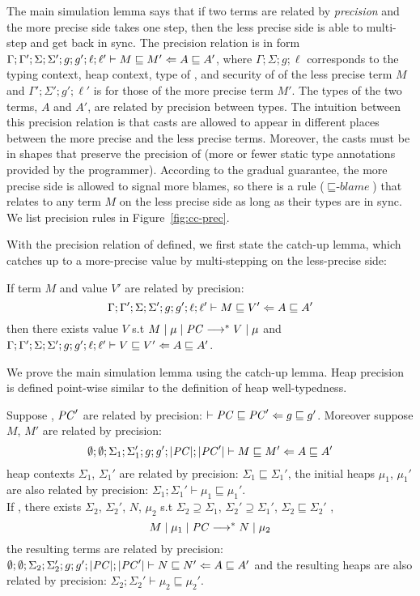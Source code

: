 The main simulation lemma says that if two terms are related by
\textit{precision} and the more precise side takes one step, then the less
precise side is able to multi-step and get back in sync. The precision relation
is in form
${\Gamma};{\Gamma'};{\Sigma};{\Sigma'};{g};{g'};{\ell};{\ell'}\vdash{M}\sqsubseteq{M'}\Leftarrow{A}\sqsubseteq{A'}$,
where $\Gamma;\Sigma;g;\ell$ corresponds to the typing context, heap context,
type of \PC, and security of \PC of the less precise term $M$ and
$\Gamma';\Sigma';g';\ell'$ is for those of the more precise term $M'$. The types
of the two terms, $A$ and $A'$, are related by precision between types. The
intuition between this precision relation is that casts are allowed to appear in
different places between the more precise and the less precise \CC terms.
Moreover, the casts must be in shapes that preserve the precision of \Surface
(more or fewer static type annotations provided by the programmer). According to
the gradual guarantee, the more precise side is allowed to signal more blames,
so there is a rule (${\sqsubseteq}\textit{-blame}$) that relates  to
any term $M$ on the less precise side as long as their types are in sync. We
list precision rules in Figure~\ref{fig:cc-prec}.

With the precision relation of \CC defined, we first state the catch-up lemma,
which catches up to a more-precise value by multi-stepping on the less-precise
side:

\begin{lemma}
\label{lem:catchup}
If term $M$ and value $V'$ are related by precision:
$${\Gamma};{\Gamma'};{\Sigma};{\Sigma'};{g};{g'};{\ell};{\ell'}\vdash{M}\sqsubseteq{V'}\Leftarrow{A}\sqsubseteq{A'}$$
then there exists value $V$ s.t $M\mid\mu\mid\mathit{PC} \longrightarrow^{*} V\mid\mu$ and
${\Gamma};{\Gamma'};{\Sigma};{\Sigma'};{g};{g'};{\ell};{\ell'}\vdash{V}\sqsubseteq{V'}\Leftarrow{A}\sqsubseteq{A'}$.
\end{lemma}

We prove the main simulation lemma using the catch-up lemma. Heap precision is
defined point-wise similar to the definition of heap well-typedness.

\begin{lemma}
\label{lem:sim}
Suppose \PC, $\mathit{PC}'$ are related by precision: $\ccprec{\PC}{\PC'}{g}{g'}$.
Moreover suppose $M$, $M'$ are related by precision:
$${\emptyset};{\emptyset};{\Sigma_1};{\Sigma_1'};{g};{g'};{|\mathit{PC}|};{|\mathit{PC}'|}\vdash{M}\sqsubseteq{M'}\Leftarrow{A}\sqsubseteq{A'}$$
heap contexts $\Sigma_1$, $\Sigma_1'$ are related by precision:
$\Sigma_1 \sqsubseteq \Sigma_1'$, the initial heaps $\mu_1$, $\mu_1'$
are also related by precision: $\Sigma_1 ; \Sigma_1' \vdash \mu_1 \sqsubseteq \mu_1'$. \\
If , there exists $\Sigma_2$,
$\Sigma_2'$, $N$, $\mu_2$ s.t $\Sigma_2 \supseteq \Sigma_1$,
$\Sigma_2' \supseteq \Sigma_1'$, $\Sigma_2 \sqsubseteq \Sigma_2'$ ,
$$M\mid\mu_1\mid\mathit{PC} \longrightarrow^{*} N\mid\mu_2$$
the resulting terms are related by precision:
${\emptyset};{\emptyset};{\Sigma_2};{\Sigma_2'};{g};{g'};{|\mathit{PC}|};{|\mathit{PC}'|}\vdash{N}\sqsubseteq{N'}\Leftarrow{A}\sqsubseteq{A'}$
and the resulting heaps are also related by precision: $\Sigma_2 ; \Sigma_2' \vdash \mu_2 \sqsubseteq \mu_2'$.
\end{lemma}


